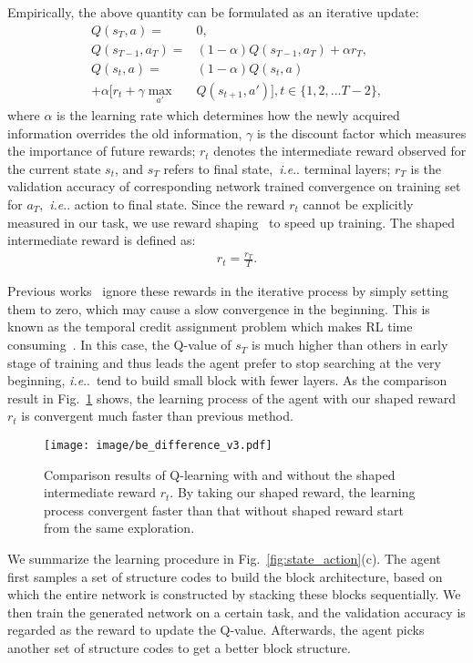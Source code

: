\documentclass[10pt,journal,compsoc]{IEEEtran}
\makeatletter
\DeclareRobustCommand\onedot{\futurelet\@let@token\@onedot}
\def\@onedot{\ifx\@let@token.\else.\null\fi\xspace}
\def\ie{\emph{i.e}\onedot} \def\Ie{\emph{I.e}\onedot}
\makeatother
\begin{document}
Empirically, the above quantity can be formulated as an iterative update:
\begin{align}
Q(s_T,a) =& 0,\\
Q(s_{T-1},a_T) =& (1-\alpha)Q(s_{T-1},a_T) + \alpha r_T,\\
\nonumber Q(s_t,a)=&(1-\alpha)Q(s_t,a)\\
+ \alpha [r_t+\gamma \max_{a'}&Q(s_{t+1},a')], t \in\{1,2,...T-2\},
\end{align}
where \(\alpha\) is the learning rate which determines how the newly acquired information overrides the old information, \(\gamma\) is the discount factor which measures the importance of future rewards;
\(r_t\) denotes the intermediate reward observed for the current state \(s_{t}\), and $s_{T}$ refers to final state,~\ie terminal layers; $r_T$ is the validation accuracy of corresponding network trained convergence on training set for $a_T$,~\ie action to final state. Since the reward \(r_t\) cannot be explicitly measured in our task, we use reward shaping~\cite{ng1999policy} to speed up training. The shaped intermediate reward is defined as:
\begin{eqnarray}
r_t = \frac{r_T}{T}.
\end{eqnarray}

Previous works~\cite{baker2016designing} ignore these rewards in the iterative process by simply setting them to zero, which may cause a slow convergence in the beginning. This is known as the temporal credit assignment problem which makes RL time consuming~\cite{sutton1998reinforcement}. In this case, the Q-value of $s_T$ is much higher than others in early stage of training and thus leads the agent prefer to stop searching at the very beginning, \ie~tend to build small block with fewer layers.
As the comparison result in Fig.~\ref{fig:acc_reward} shows, the learning process of the agent with our shaped reward \(r_t\) is convergent much faster than previous method.



\begin{figure}[tbp]
	\centering
	\texttt{[image: image/be\_difference\_v3.pdf]}
	\caption{Comparison results of Q-learning with and without the shaped intermediate reward $r_t$. By taking our shaped reward, the learning process convergent faster than that without shaped reward start from the same exploration.}
	\label{fig:acc_reward}
\end{figure}


We summarize the learning procedure in Fig.~\ref{fig:state_action}(c). The agent first samples a set of structure codes to build the block architecture, based on which the entire network is constructed by stacking these blocks sequentially. We then train the generated network on a certain task, and the validation accuracy is regarded as the reward to update the Q-value. Afterwards, the agent picks another set of structure codes to get a better block structure.
\end{document}
